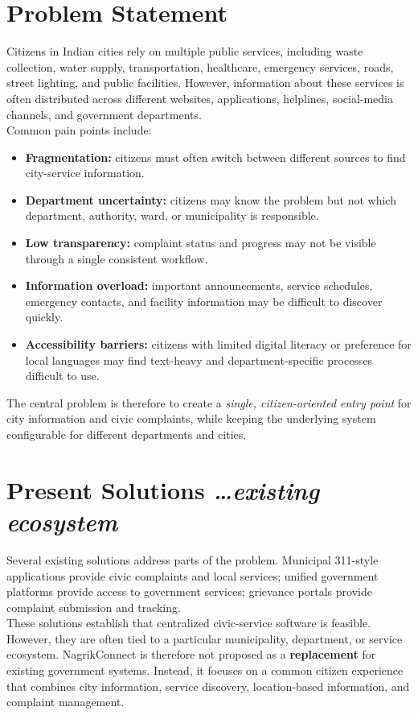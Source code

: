 \documentclass[11pt,a4paper]{article}
\newcommand{\BvrHint}[1]{{\normalfont\normalsize\itshape\hfill #1}}
\begin{document}
\section{Problem Statement}
Citizens in Indian cities rely on multiple public services, including waste collection, water supply, transportation, healthcare, emergency services, roads, street lighting, and public facilities. However, information about these services is often distributed across different websites, applications, helplines, social-media channels, and government departments.
\\
Common pain points include:
\begin{itemize}[leftmargin=0.7cm]
    \item \textbf{Fragmentation:} citizens must often switch between different sources to find city-service information.
    \item \textbf{Department uncertainty:} citizens may know the problem but not which department, authority, ward, or municipality is responsible.
    \item \textbf{Low transparency:} complaint status and progress may not be visible through a single consistent workflow.
    \item \textbf{Information overload:} important announcements, service schedules, emergency contacts, and facility information may be difficult to discover quickly.
    \item \textbf{Accessibility barriers:} citizens with limited digital literacy or preference for local languages may find text-heavy and department-specific processes difficult to use.
\end{itemize}

The central problem is therefore to create a \emph{single, citizen-oriented entry point} for city information and civic complaints, while keeping the underlying system configurable for different departments and cities.

\section{Present Solutions %
\BvrHint{\ldots existing ecosystem}}
Several existing solutions address parts of the problem. Municipal 311-style applications provide civic complaints and local services; unified government platforms provide access to government services; grievance portals provide complaint submission and tracking.\\

These solutions establish that centralized civic-service software is feasible. However, they are often tied to a particular municipality, department, or service ecosystem. NagrikConnect is therefore not proposed as a \textbf{replacement} for existing government systems. Instead, it focuses on a common citizen experience that combines city information, service discovery, location-based information, and complaint management.
\end{document}
